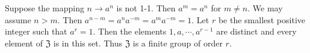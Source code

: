 Suppose the mapping $n \to a^n$ is not 1-1. Then $a^m = a^n$ for $m \neq n$. We may assume $n > m$. Then $a^{n-m} = a^n a^{-m} = a^m a^{-m} = 1$. Let $r$ be the smallest positive integer such that $a^r = 1$. Then the elements $1, a, \cdots, a^{r-1}$ are distinct and every element of $\mathfrak{Z}$ is in this set. Thus $\mathfrak{Z}$ is a finite group of order $r$.
